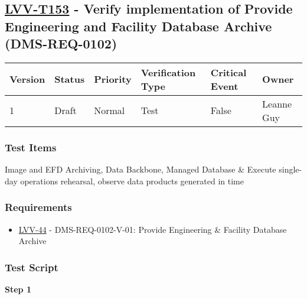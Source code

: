 \hypertarget{lvv-t153---verify-implementation-of-provide-engineering-and-facility-database-archive-dms-req-0102}{%
\subsection{\texorpdfstring{\href{https://jira.lsstcorp.org/secure/Tests.jspa\#/testCase/LVV-T153}{LVV-T153}
- Verify implementation of Provide Engineering and Facility Database
Archive
(DMS-REQ-0102)}{LVV-T153 - Verify implementation of Provide Engineering and Facility Database Archive (DMS-REQ-0102)}}\label{lvv-t153---verify-implementation-of-provide-engineering-and-facility-database-archive-dms-req-0102}}

\begin{longtable}[]{@{}llllll@{}}
\toprule
Version & Status & Priority & Verification Type & Critical Event &
Owner\tabularnewline
\midrule
\endhead
1 & Draft & Normal & Test & False & Leanne Guy\tabularnewline
\bottomrule
\end{longtable}

\hypertarget{test-items-129}{%
\subsubsection{Test Items}\label{test-items-129}}

Image and EFD Archiving, Data Backbone, Managed Database \& Execute
single-day operations rehearsal, observe data products generated in time

\hypertarget{requirements-130}{%
\subsubsection{Requirements}\label{requirements-130}}

\begin{itemize}
\tightlist
\item
  \href{https://jira.lsstcorp.org/browse/LVV-44}{LVV-44} -
  DMS-REQ-0102-V-01: Provide Engineering \& Facility Database Archive
\end{itemize}

\hypertarget{test-script-130}{%
\subsubsection{Test Script}\label{test-script-130}}

\textbf{Step 1}\\
~\\
~\\

